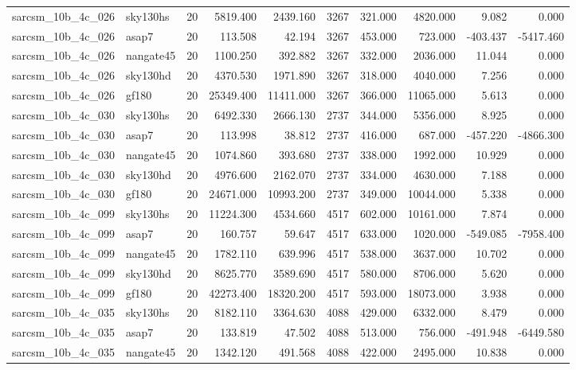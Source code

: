 \begin{tabular}{llrrrrrrrr}
sarcsm\_10b\_4c\_026 & sky130hs & 20 & 5819.400 & 2439.160 & 3267 & 321.000 & 4820.000 & 9.082 & 0.000 \\
sarcsm\_10b\_4c\_026 & asap7 & 20 & 113.508 & 42.194 & 3267 & 453.000 & 723.000 & -403.437 & -5417.460 \\
sarcsm\_10b\_4c\_026 & nangate45 & 20 & 1100.250 & 392.882 & 3267 & 332.000 & 2036.000 & 11.044 & 0.000 \\
sarcsm\_10b\_4c\_026 & sky130hd & 20 & 4370.530 & 1971.890 & 3267 & 318.000 & 4040.000 & 7.256 & 0.000 \\
sarcsm\_10b\_4c\_026 & gf180 & 20 & 25349.400 & 11411.000 & 3267 & 366.000 & 11065.000 & 5.613 & 0.000 \\
sarcsm\_10b\_4c\_030 & sky130hs & 20 & 6492.330 & 2666.130 & 2737 & 344.000 & 5356.000 & 8.925 & 0.000 \\
sarcsm\_10b\_4c\_030 & asap7 & 20 & 113.998 & 38.812 & 2737 & 416.000 & 687.000 & -457.220 & -4866.300 \\
sarcsm\_10b\_4c\_030 & nangate45 & 20 & 1074.860 & 393.680 & 2737 & 338.000 & 1992.000 & 10.929 & 0.000 \\
sarcsm\_10b\_4c\_030 & sky130hd & 20 & 4976.600 & 2162.070 & 2737 & 334.000 & 4630.000 & 7.188 & 0.000 \\
sarcsm\_10b\_4c\_030 & gf180 & 20 & 24671.000 & 10993.200 & 2737 & 349.000 & 10044.000 & 5.338 & 0.000 \\
sarcsm\_10b\_4c\_099 & sky130hs & 20 & 11224.300 & 4534.660 & 4517 & 602.000 & 10161.000 & 7.874 & 0.000 \\
sarcsm\_10b\_4c\_099 & asap7 & 20 & 160.757 & 59.647 & 4517 & 633.000 & 1020.000 & -549.085 & -7958.400 \\
sarcsm\_10b\_4c\_099 & nangate45 & 20 & 1782.110 & 639.996 & 4517 & 538.000 & 3637.000 & 10.702 & 0.000 \\
sarcsm\_10b\_4c\_099 & sky130hd & 20 & 8625.770 & 3589.690 & 4517 & 580.000 & 8706.000 & 5.620 & 0.000 \\
sarcsm\_10b\_4c\_099 & gf180 & 20 & 42273.400 & 18320.200 & 4517 & 593.000 & 18073.000 & 3.938 & 0.000 \\
sarcsm\_10b\_4c\_035 & sky130hs & 20 & 8182.110 & 3364.630 & 4088 & 429.000 & 6332.000 & 8.479 & 0.000 \\
sarcsm\_10b\_4c\_035 & asap7 & 20 & 133.819 & 47.502 & 4088 & 513.000 & 756.000 & -491.948 & -6449.580 \\
sarcsm\_10b\_4c\_035 & nangate45 & 20 & 1342.120 & 491.568 & 4088 & 422.000 & 2495.000 & 10.838 & 0.000 \\

\end{tabular}
